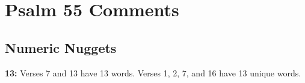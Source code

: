 \section{Psalm 55 Comments}

\subsection{Numeric Nuggets}
\textbf{13:} Verses 7 and 13 have 13 words. Verses 1, 2, 7, and 16 have 13 unique words.